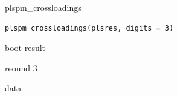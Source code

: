 \documentclass[a4paper]{book}
\begin{document}
%
\begin{Description}
plspm\_crossloadings
\end{Description}
%
\begin{Usage}
\begin{verbatim}
plspm_crossloadings(plsres, digits = 3)
\end{verbatim}
\end{Usage}
%
\begin{Arguments}
\begin{ldescription}
\item[\code{plsres}] boot result

\item[\code{digits}] reound 3
\end{ldescription}
\end{Arguments}
%
\begin{Value}
data
\end{Value}
\end{document}
